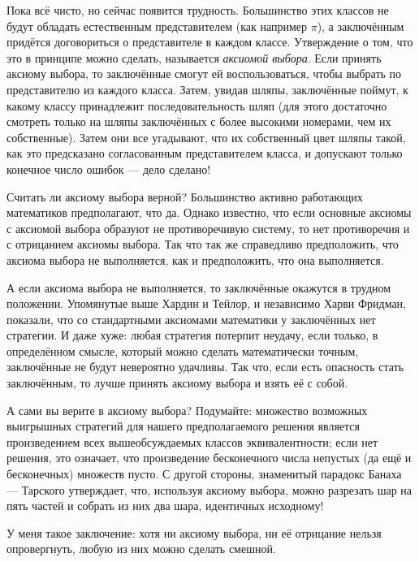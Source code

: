 Пока всё чисто, но сейчас появится трудность.
Большинство этих классов не будут обладать естественным представителем (как например $\pi$),
а заключённым придётся договориться о представителе в каждом классе.
Утверждение о том, что это в принципе можно сделать, называется \emph{аксиомой выбора}.
Если принять аксиому выбора, то заключённые смогут ей воспользоваться, чтобы выбрать по представителю из каждого класса.
Затем, увидав шляпы, заключённые поймут, к какому классу принадлежит последовательность шляп (для этого достаточно смотреть только на шляпы заключённых с более высокими номерами, чем их собственные).
Затем они все угадывают, что их собственный цвет шляпы такой, как это предсказано согласованным представителем класса, и допускают только конечное число ошибок --- дело сделано!

Считать ли аксиому выбора верной?
Большинство активно работающих математиков предполагают, что да.
Однако известно, что если основные аксиомы с аксиомой выбора образуют не противоречивую систему, то нет противоречия и с отрицанием аксиомы выбора.
Так что так же справедливо предположить, что аксиома выбора не выполняется, как и предположить, что она выполняется.

А если аксиома выбора не выполняется, то заключённые окажутся в трудном положении.
Упомянутые выше Хардин и Тейлор, и независимо Харви Фридман, показали, что со стандартными аксиомами математики у заключённых нет стратегии.
И даже хуже: любая стратегия потерпит неудачу, если только, в определённом смысле, который можно сделать математически точным, заключённые не будут невероятно удачливы.
Так что, если есть опасность стать заключённым, то лучше принять аксиому выбора и взять её с собой.

А сами вы верите в аксиому выбора?
Подумайте: множество возможных выигрышных стратегий для нашего предполагаемого решения является произведением всех вышеобсуждаемых классов эквивалентности; если нет решения, это означает, что произведение бесконечного числа непустых (да ещё и бесконечных) множеств пусто.
С другой стороны, знаменитый парадокс Банаха --- Тарского утверждает, что, используя аксиому выбора, можно разрезать шар на пять частей и собрать из них два шара, идентичных исходному!

У меня такое заключение: хотя ни аксиому выбора, ни её отрицание нельзя опровергнуть, любую из них можно сделать смешной.

% 

